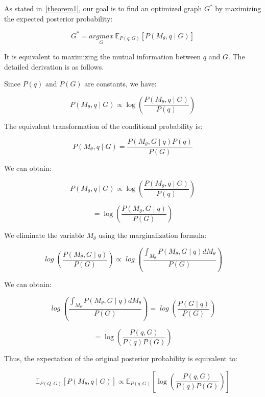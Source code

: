 \documentclass[11pt]{article}
\begin{document}
As stated in~\ref{theorem1}, our goal is to find an optimized graph $  G^*  $ by maximizing the expected posterior probability:

\[{G^{*} = \underset{G}{argmax}}{~\mathbb{E}_{P(q,G)}\left\lbrack P\left( M_{\theta},q \middle| G \right) \right\rbrack}\]

It is equivalent to maximizing the mutual information between $  q  $ and $  G  $.
The detailed derivation is as follows.

Since $  P(q)  $ and $  P(G)  $ are constants, we have:

{\small
\[P\left( M_{\theta},q \middle| G \right) \propto {\log\left( \frac{P\left( M_{\theta},q \middle| G \right)}{P(q)} \right)}\]
}

The equivalent transformation of the conditional probability is:

{\small
\[P\left( M_{\theta},q \middle| G \right) = \frac{P\left( M_{\theta},G \middle| q \right)P(q)}{P(G)}\]
}

We can obtain:

{\small
\[P\left( M_{\theta},q \middle| G \right) \propto {\log\left( \frac{P\left( M_{\theta},q \middle| G \right)}{P(q)} \right)}\]
}
{\small

\[{{= \log}\left( \frac{P\left( M_{\theta},G \middle| q \right)}{P(G)} \right)}\]

}

We eliminate the variable $  M_\theta  $ using the marginalization formula:

{\small
\[{\mathit{\log}\left( \frac{P\left( M_{\theta},G \middle| q \right)}{P(G)} \right)} \propto {\mathit{\log}\left( \frac{\int_{M_{\theta}}^{}{P\left( M_{\theta},G \middle| q \right)dM_{\theta}}}{P(G)} \right)}\]
}

We can obtain:

{\small

\[{\mathit{\log}\left( \frac{\int_{M_{\theta}}^{}{P\left( M_{\theta},G \middle| q \right)dM_{\theta}}}{P(G)} \right)} = \mathit{\log}\left( \frac{P\left( G \middle| q \right)}{P(G)} \right)\]

}

{\small

\[= {\log\left( \frac{P\left( {q,G} \right)}{P(q)P(G)} \right)}\]

}
Thus, the expectation of the original posterior probability is equivalent to:

{\small

\[\mathbb{E}_{P(Q,G)}\left\lbrack P\left( M_{\theta},q \middle| G \right) \right\rbrack \propto \mathbb{E}_{P(q,G)}\left\lbrack {\log\left( \frac{P\left( {q,G} \right)}{P(q)P(G)} \right)} \right\rbrack\]

}
\end{document}
